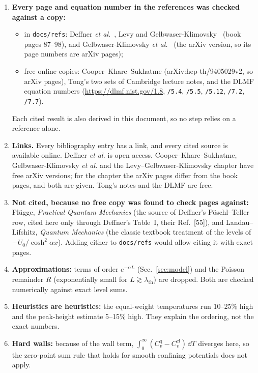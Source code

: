 \documentclass[11pt]{article}
\numberwithin{equation}{section}
\newcommand{\lth}{\lambda_{\mathrm{th}}}
\newcommand{\Cq}{C_v^{\mathrm{q}}}
\newcommand{\Ccl}{C_v^{\mathrm{cl}}}
\begin{document}
\begin{enumerate}[itemsep=2pt]
\item \textbf{Every page and equation number in the references was checked against a copy:}
\begin{itemize}[itemsep=0pt]
\item in \texttt{docs/refs}: Deffner \emph{et al.}~\cite{deffner2014}, Levy and Gelbwaser-Klimovsky~\cite{LGK} (book pages 87--98), and Gelbwaser-Klimovsky \emph{et al.}~\cite{GK} (the arXiv version, so its page numbers are arXiv pages);
\item free online copies: Cooper--Khare--Sukhatme (arXiv:hep-th/9405029v2, so arXiv pages), Tong's two sets of Cambridge lecture notes, and the DLMF equation numbers (\url{https://dlmf.nist.gov/1.8}, \texttt{/5.4}, \texttt{/5.5}, \texttt{/5.12}, \texttt{/7.2}, \texttt{/7.7}).
\end{itemize}
Each cited result is also derived in this document, so no step relies on a reference alone.
\item \textbf{Links.} Every bibliography entry has a link, and every cited source is available online. Deffner \emph{et al.} is open access. Cooper--Khare--Sukhatme, Gelbwaser-Klimovsky \emph{et al.} and the Levy--Gelbwaser-Klimovsky chapter have free arXiv versions; for the chapter the arXiv pages differ from the book pages, and both are given. Tong's notes and the DLMF are free.
\item \textbf{Not cited, because no free copy was found to check pages against:} Fl\"ugge, \emph{Practical Quantum Mechanics} (the source of Deffner's P\"oschl--Teller row, cited here only through Deffner's Table~I, their Ref.~[55]), and Landau--Lifshitz, \emph{Quantum Mechanics} (the classic textbook treatment of the levels of $-U_0/\cosh^2\alpha x$). Adding either to \texttt{docs/refs} would allow citing it with exact pages.
\item \textbf{Approximations:} terms of order $e^{-\alpha L}$ (Sec.~\ref{sec:model}) and the Poisson remainder $R$ (exponentially small for $L\gtrsim\lth$) are dropped. Both are checked numerically against exact level sums.
\item \textbf{Heuristics are heuristics:} the equal-weight temperatures run 10--25\% high and the peak-height estimate 5--15\% high. They explain the ordering, not the exact numbers.
\item \textbf{Hard walls:} because of the wall term, $\int_0^\infty(\Cq-\Ccl)\,\dd T$ diverges here, so the zero-point sum rule that holds for smooth confining potentials does not apply.
\end{enumerate}
\end{document}

